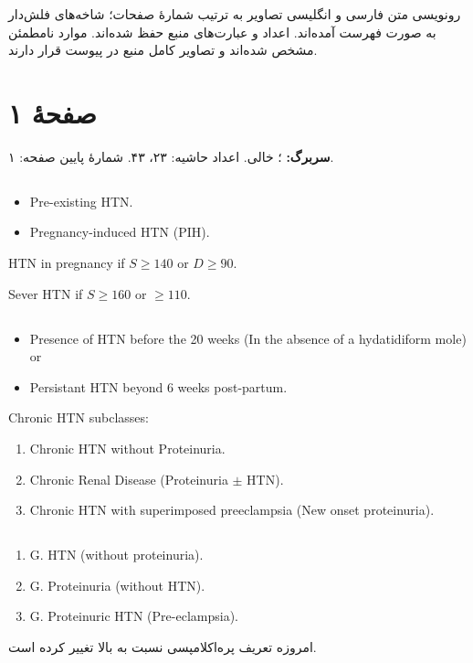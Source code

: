 \documentclass[12pt,a4paper]{article}
\begin{document}
\fi
\providecommand{\HTNpage}[1]{\clearpage\section*{صفحهٔ #1}}
\providecommand{\HTNm}[1]{\lr{\(#1\)}}
\providecommand{\HTNunclear}[1]{\textbf{[خوانش نامطمئن: #1]}}
\begin{center}\Large\bfseries{}\end{center}
رونویسی متن فارسی و انگلیسی تصاویر به ترتیب شمارهٔ صفحات؛ شاخه‌های فلش‌دار به صورت فهرست آمده‌اند. اعداد و عبارت‌های منبع حفظ شده‌اند. موارد نامطمئن مشخص شده‌اند و تصاویر کامل منبع در پیوست قرار دارند.

\HTNpage{۱}
\textbf{سربرگ:} ؛  خالی. اعداد حاشیه: ۲۳، ۴۳. شمارهٔ پایین صفحه: ۱.
\subsection*{}
\begin{latin}
\begin{itemize}
\item Pre-existing HTN.
\item Pregnancy-induced HTN (PIH).
\end{itemize}
HTN in pregnancy if \(S\geq140\) or \(D\geq90\).

Sever HTN if \(S\geq160\) or \(\geq110\).
\end{latin}
\subsection*{}
\begin{latin}
\begin{itemize}
\item Presence of HTN before the 20 weeks (In the absence of a hydatidiform mole) or
\item Persistant HTN beyond 6 weeks post-partum.
\end{itemize}
Chronic HTN subclasses:
\begin{enumerate}
\item Chronic HTN without Proteinuria.
\item Chronic Renal Disease (Proteinuria \(\pm\) HTN).
\item Chronic HTN with superimposed preeclampsia (New onset proteinuria).
\end{enumerate}
\end{latin}
\subsection*{}
\begin{latin}\begin{enumerate}
\item G. HTN (without proteinuria).
\item G. Proteinuria (without HTN).
\item G. Proteinuric HTN (Pre-eclampsia).
\end{enumerate}\end{latin}
امروزه تعریف پره‌اکلامپسی نسبت به بالا تغییر کرده است.
\end{document}
